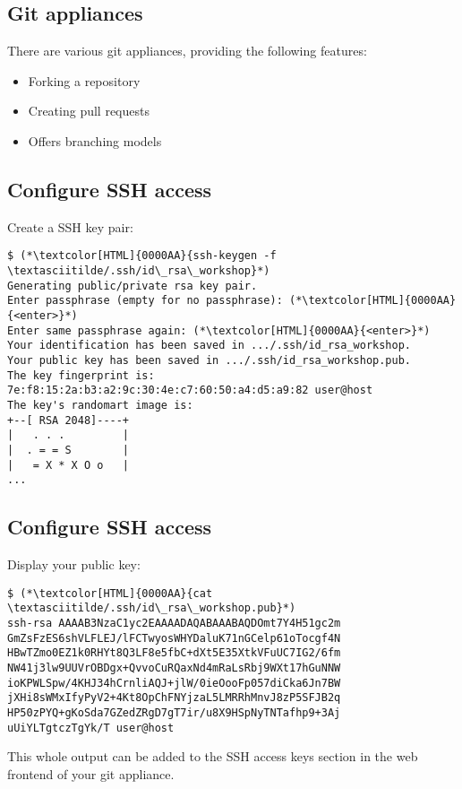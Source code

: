 \subsection{Git appliances}
\begin{frame}[fragile]
  \subslidetitle
  There are various git appliances, providing the following features:
  \begin{itemize}
    \item Forking a repository
    \item Creating pull requests
    \item Offers branching models
  \end{itemize}
\end{frame}

\subsection{Configure SSH access}
\begin{frame}[fragile]
  \subslidetitle
  Create a SSH key pair:
  \begin{lstlisting}
$ (*\textcolor[HTML]{0000AA}{ssh-keygen -f \textasciitilde/.ssh/id\_rsa\_workshop}*)
Generating public/private rsa key pair.
Enter passphrase (empty for no passphrase): (*\textcolor[HTML]{0000AA}{<enter>}*)
Enter same passphrase again: (*\textcolor[HTML]{0000AA}{<enter>}*)
Your identification has been saved in .../.ssh/id_rsa_workshop.
Your public key has been saved in .../.ssh/id_rsa_workshop.pub.
The key fingerprint is:
7e:f8:15:2a:b3:a2:9c:30:4e:c7:60:50:a4:d5:a9:82 user@host
The key's randomart image is:
+--[ RSA 2048]----+
|   . . .         |
|  . = = S        |
|   = X * X O o   |
...
\end{lstlisting}
\end{frame}

\subsection{Configure SSH access}
\begin{frame}[fragile]
  \subslidetitle
  Display your public key:
  \begin{lstlisting}
$ (*\textcolor[HTML]{0000AA}{cat \textasciitilde/.ssh/id\_rsa\_workshop.pub}*)
ssh-rsa AAAAB3NzaC1yc2EAAAADAQABAAABAQDOmt7Y4H51gc2m
GmZsFzES6shVLFLEJ/lFCTwyosWHYDaluK71nGCelp61oTocgf4N
HBwTZmo0EZ1k0RHYt8Q3LF8e5fbC+dXt5E35XtkVFuUC7IG2/6fm
NW41j3lw9UUVrOBDgx+QvvoCuRQaxNd4mRaLsRbj9WXt17hGuNNW
ioKPWLSpw/4KHJ34hCrnliAQJ+jlW/0ieOooFp057diCka6Jn7BW
jXHi8sWMxIfyPyV2+4Kt8OpChFNYjzaL5LMRRhMnvJ8zP5SFJB2q
HP50zPYQ+gKoSda7GZedZRgD7gT7ir/u8X9HSpNyTNTafhp9+3Aj
uUiYLTgtczTgYk/T user@host
\end{lstlisting}

  This whole output can be added to the SSH access keys
  section in the web frontend of your git appliance.
\end{frame}

